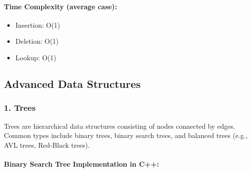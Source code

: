 \hypertarget{time-complexity-average-case}{%
\paragraph{Time Complexity (average
case):}\label{time-complexity-average-case}}

\begin{itemize}
\tightlist
\item
  Insertion: O(1)
\item
  Deletion: O(1)
\item
  Lookup: O(1)
\end{itemize}

\hypertarget{advanced-data-structures}{%
\subsection{Advanced Data Structures}\label{advanced-data-structures}}

\hypertarget{trees}{%
\subsubsection{1. Trees}\label{trees}}

Trees are hierarchical data structures consisting of nodes connected by
edges. Common types include binary trees, binary search trees, and
balanced trees (e.g., AVL trees, Red-Black trees).

\hypertarget{binary-search-tree-implementation-in-c}{%
\paragraph{Binary Search Tree Implementation in
C++:}\label{binary-search-tree-implementation-in-c}}

